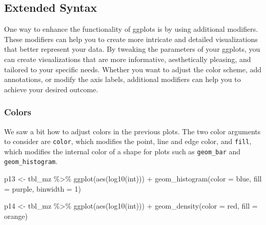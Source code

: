 \documentclass[
]{book}
\newenvironment{Shaded}{\begin{snugshade}}{\end{snugshade}}
\newcommand{\AttributeTok}[1]{\textcolor[rgb]{0.77,0.63,0.00}{#1}}
\newcommand{\DecValTok}[1]{\textcolor[rgb]{0.00,0.00,0.81}{#1}}
\newcommand{\FunctionTok}[1]{\textcolor[rgb]{0.00,0.00,0.00}{#1}}
\newcommand{\NormalTok}[1]{#1}
\newcommand{\OtherTok}[1]{\textcolor[rgb]{0.56,0.35,0.01}{#1}}
\newcommand{\SpecialCharTok}[1]{\textcolor[rgb]{0.00,0.00,0.00}{#1}}
\newcommand{\StringTok}[1]{\textcolor[rgb]{0.31,0.60,0.02}{#1}}
\begin{document}
\hypertarget{extended-syntax}{%
\subsection{Extended Syntax}\label{extended-syntax}}

One way to enhance the functionality of ggplots is by using additional modifiers. These modifiers can help you to create more intricate and detailed visualizations that better represent your data. By tweaking the parameters of your ggplots, you can create visualizations that are more informative, aesthetically pleasing, and tailored to your specific needs. Whether you want to adjust the color scheme, add annotations, or modify the axis labels, additional modifiers can help you to achieve your desired outcome.

\hypertarget{colors}{%
\subsubsection*{Colors}\label{colors}}

We saw a bit how to adjust colors in the previous plots. The two color arguments to consider are \texttt{color}, which modifies the point, line and edge color, and \texttt{fill}, which modifies the internal color of a shape for plots such as \texttt{geom\_bar} and \texttt{geom\_histogram}.

\begin{Shaded}
\begin{Highlighting}[]
\NormalTok{p13 }\OtherTok{\textless{}{-}}\NormalTok{ tbl\_mz }\SpecialCharTok{\%\textgreater{}\%} 
  \FunctionTok{ggplot}\NormalTok{(}\FunctionTok{aes}\NormalTok{(}\FunctionTok{log10}\NormalTok{(int))) }\SpecialCharTok{+} 
  \FunctionTok{geom\_histogram}\NormalTok{(}\AttributeTok{color =} \StringTok{\textquotesingle{}blue\textquotesingle{}}\NormalTok{, }\AttributeTok{fill =} \StringTok{\textquotesingle{}purple\textquotesingle{}}\NormalTok{, }\AttributeTok{binwidth =} \DecValTok{1}\NormalTok{)}

\NormalTok{p14 }\OtherTok{\textless{}{-}}\NormalTok{ tbl\_mz }\SpecialCharTok{\%\textgreater{}\%} 
  \FunctionTok{ggplot}\NormalTok{(}\FunctionTok{aes}\NormalTok{(}\FunctionTok{log10}\NormalTok{(int))) }\SpecialCharTok{+} 
  \FunctionTok{geom\_density}\NormalTok{(}\AttributeTok{color =} \StringTok{\textquotesingle{}red\textquotesingle{}}\NormalTok{, }\AttributeTok{fill =} \StringTok{\textquotesingle{}orange\textquotesingle{}}\NormalTok{)}
\end{Highlighting}
\end{Shaded}
\end{document}
